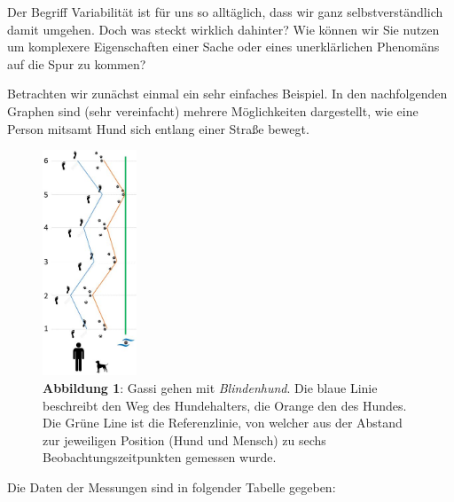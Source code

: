 \documentclass[
]{article}
\begin{document}
Der Begriff Variabilität ist für uns so alltäglich, dass wir ganz selbstverständlich damit umgehen. Doch was steckt wirklich dahinter? Wie können wir Sie nutzen um komplexere Eigenschaften einer Sache oder eines unerklärlichen Phenomäns auf die Spur zu kommen?

Betrachten wir zunächst einmal ein sehr einfaches Beispiel. In den nachfolgenden Graphen sind (sehr vereinfacht) mehrere Möglichkeiten dargestellt, wie eine Person mitsamt Hund sich entlang einer Straße bewegt.

\begin{figure}
\centering
\includegraphics[width=0.25\textwidth,height=\textheight]{Images/GassiPositiveKorrelation.JPG}
\caption{\textbf{Abbildung 1}: Gassi gehen mit \emph{Blindenhund}. Die blaue Linie beschreibt den Weg des Hundehalters, die Orange den des Hundes. Die Grüne Line ist die Referenzlinie, von welcher aus der Abstand zur jeweiligen Position (Hund und Mensch) zu sechs Beobachtungszeitpunkten gemessen wurde.}
\end{figure}

Die Daten der Messungen sind in folgender Tabelle gegeben:
\end{document}
